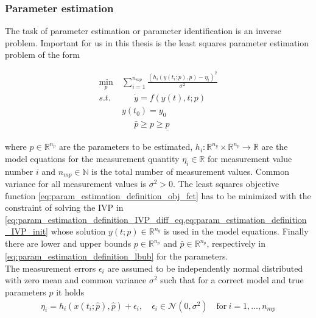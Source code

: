 \documentclass{scrartcl}[12pt, halfparskip]
\numberwithin{equation}{section}
\numberwithin{figure}{section}
\numberwithin{table}{section}
\begin{document}
\subsubsection{Parameter estimation}
\label{sec:parameter_estimation_theory}

The task of parameter estimation or parameter identification is an inverse problem. Important for us in this thesis is the least squares parameter estimation problem of the form

\begin{subequations}
\begin{align}
	\min_p \ & \sum_{i=1}^{n_{mp}}  \frac{(h_i(y(t_i;p),p) - \eta_i)^2}{\sigma^2} \label{eq:param_estimation_definition_obj_fct} \\
	s.t. \ & \quad \ \ \dot{y} = f(y(t),t;p) \label{eq:param_estimation_definition_IVP_diff_eq} \\
	& y(t_0) = y_0 \label{eq:param_estimation_definition_IVP_init} \\
	&  \quad \ \ \bar{p} \ge p \ge \underline{p} \label{eq:param_estimation_definition_lbub}
\end{align}
\label{eq:param_estimation_definition}
\end{subequations}

where $p \in \mathbb{R}^{n_p}$ are the parameters to be estimated, $h_i: \mathbb{R}^{n_y} \times \mathbb{R}^{n_p} \rightarrow \mathbb{R}$ are the model equations for the measurement quantity $\eta_i \in \mathbb{R}$ for measurement value number $i$ and $n_{mp} \in \mathbb{N}$ is the total number of measurement values. Common variance for all measurement values is $\sigma^2 > 0$. The least squares objective function \cref{eq:param_estimation_definition_obj_fct} has to be minimized with the constraint of solving the IVP in \cref{eq:param_estimation_definition_IVP_diff_eq,eq:param_estimation_definition_IVP_init} whose solution $y(t;p) \in \mathbb{R}^{n_y}$ is used in the model equations. Finally there are lower and upper bounds $\underline{p} \in \mathbb{R}^{n_p}$ and $\bar{p} \in \mathbb{R}^{n_p}$, respectively in \cref{eq:param_estimation_definition_lbub} for the parameters. \\
The measurement errors $\epsilon_i$ are assumed to be independently normal distributed with zero mean and common variance $\sigma^2$ such that for a correct model and true parameters $\hat{p}$ it holds
\begin{align}
\eta_i = h_i(x(t_i;\hat{p}),\hat{p}) + \epsilon_i, \quad \epsilon_i \in \mathcal{N}(0,\sigma^2) \quad \text{for} \ i=1,...,n_{mp}
\end{align}
\end{document}
